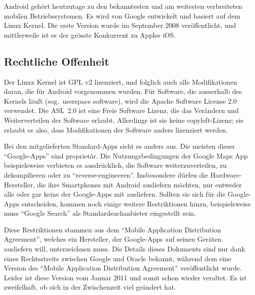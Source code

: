 Android gehört heutzutage zu den bekanntesten und am weitesten verbreiteten mobilen Betriebssystemen. Es wird von Google entwickelt und basiert auf dem Linux Kernel. Die erste Version wurde im September 2008 veröffentlicht, und mittlerweile ist es der grösste Konkurrent zu Apples iOS.
\newline

\subsection{Rechtliche Offenheit}
Der Linux Kernel ist GPL v2 lizenziert\thinspace\cite{online:kernel-license}, und folglich auch alle Modifikationen daran, die für Android vorgenommen wurden. Für Software, die ausserhalb des Kernels läuft (sog.\ userspace software), wird die Apache Software License 2.0 verwendet\thinspace\cite{online:android-licenses}. Die \mbox{ASL 2.0} ist eine Freie Software Lizenz, die das Verändern und Weiterverteilen der Software erlaubt. Allerdings ist sie  keine copyleft-Lizenz; sie erlaubt es also, dass Modifikationen der Software anders lizenziert werden\thinspace\cite{online:apache-license}.

Bei den mitgelieferten Standard-Apps sieht es anders aus. Die meisten dieser ``Google-Apps'' sind proprietär. Die Nutzungsbedingungen der Google Maps App beispielsweise verbieten es ausdrücklich, die Software weiterzuverteilen, zu dekompilieren oder zu ``reverse-engineeren''\thinspace\cite{online:google-maps-tos}. Insbesondere dürfen die \mbox{Hardware-Hersteller}, die ihre Smartphones mit Android ausliefern möchten, nur entweder alle oder gar keine der Google-Apps mit ausliefern. Sollten sie sich für die Google-Apps entscheiden, kommen noch einige weitere Restriktionen hinzu, beispielsweise muss ``Google Search'' als Standardsuchanbieter eingestellt sein\thinspace\cite{online:mada-leak}.

Diese Restriktionen stammen aus dem ``Mobile Application Distribution Agreement'', welches ein Hersteller, der Google-Apps auf seinen Geräten ausliefern will, unterzeichnen muss. Die Details dieses Dokuments sind nur dank eines Rechtsstreits zwischen Google und Oracle bekannt, während dem eine Version des ``Mobile Application Distribution Agreement'' veröffentlicht wurde\thinspace\cite{online:ars-mada-leak}. Leider ist diese Version vom Januar 2011 und somit schon wieder veraltet. Es ist zweifelhaft, ob sich in der Zwischenzeit viel geändert hat.
\newline

